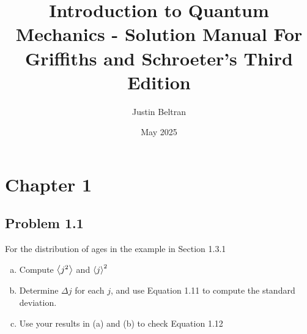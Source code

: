 \documentclass[12pt]{exam}
\title{Introduction to Quantum Mechanics - Solution Manual \newline \small{For Griffiths and Schroeter's Third Edition}}
\author{Justin Beltran}
\date{May 2025}
\begin{document}
\maketitle
{}
\printanswers

\section{Chapter 1}



\subsection*{Problem 1.1}
For the distribution of ages in the example in Section 1.3.1
\begin{enumerate}[(a)]
    \item  Compute $\expval{j^2}$ and $\expval{j}^2$

    \item Determine $\Delta j$ for each $j$, and use Equation 1.11 to compute the standard deviation.

    \item Use your results in (a) and (b) to check Equation 1.12
\end{enumerate}
\end{document}
